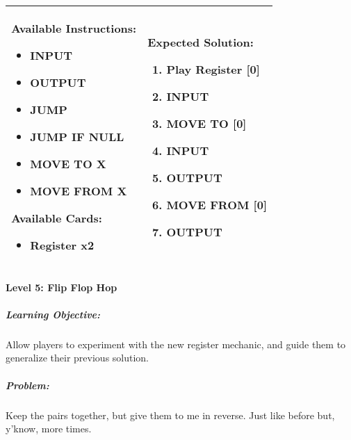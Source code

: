 \begin{center}
    \begin{tabular}{ | m{5cm} | m{9cm} | } 
        \hline
            \textbf{Available Instructions:} 
            \begin{itemize}
                \setlength\itemsep{-.35em}
                \item INPUT
                \item OUTPUT
                \item JUMP
                \item JUMP IF NULL
                \item MOVE TO X
                \item MOVE FROM X
            \end{itemize}
            \textbf{Available Cards:} 
            \begin{itemize}
                \setlength\itemsep{-.35em}
                \item Register x2
            \end{itemize}& 
            \textbf{Expected Solution:} 
            \begin{enumerate}
                \setlength\itemsep{-.35em}
                \item Play Register [0]
                \item INPUT
                \item MOVE TO [0]
                \item INPUT
                \item OUTPUT
                \item MOVE FROM [0] 
                \item OUTPUT
            \end{enumerate}
            \\
        \hline
    \end{tabular}
\end{center}


\paragraph{Level 5: Flip Flop Hop}
\subparagraph{Learning Objective:} Allow players to experiment with the new register mechanic, and guide them to generalize their previous solution.

\subparagraph{Problem:} Keep the pairs together, but give them to me in reverse. Just like before but, y'know, more times.

